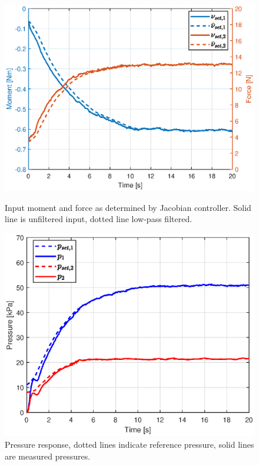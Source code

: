 \begin{figure}[H] 
    \begin{minipage}[b]{0.49\linewidth}
     \centering
    \includegraphics[width=\linewidth]{Figures/Chapter5/nuleft.eps} 
    \caption{Input moment and force as determined by Jacobian controller. Solid line is unfiltered input, dotted line low-pass filtered. } 
    \label{fig5:nuleft} 
       \end{minipage} 
    \begin{minipage}[b]{0.49\linewidth}
     \centering
    \includegraphics[width=\linewidth]{Figures/Chapter5/pressureleft.eps} 
    \caption{Pressure response, dotted lines indicate reference pressure, solid lines are measured pressures.} 
    \label{fig5:pleft} 
    \end{minipage} 
\end{figure}


